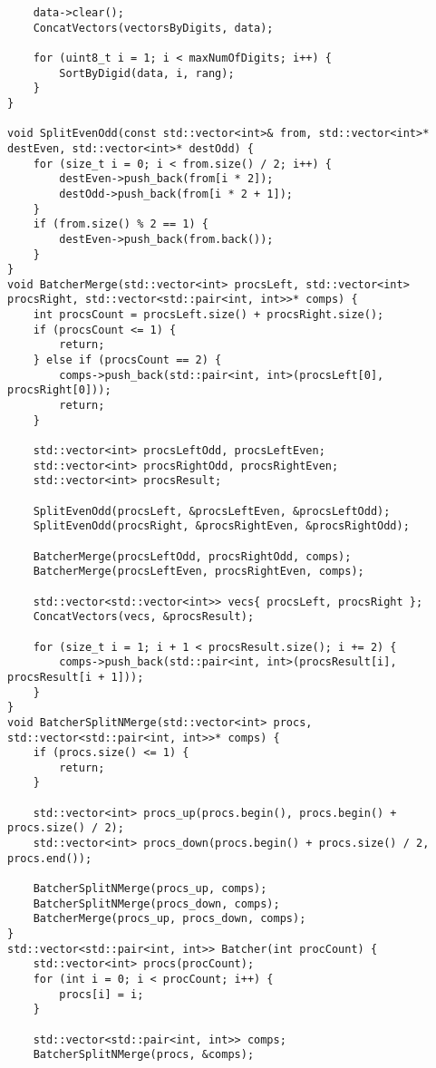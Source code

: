 \documentclass{report}
\begin{document}
\begin{lstlisting}
    data->clear();
    ConcatVectors(vectorsByDigits, data);

    for (uint8_t i = 1; i < maxNumOfDigits; i++) {
        SortByDigid(data, i, rang);
    }
}

void SplitEvenOdd(const std::vector<int>& from, std::vector<int>* destEven, std::vector<int>* destOdd) {
    for (size_t i = 0; i < from.size() / 2; i++) {
        destEven->push_back(from[i * 2]);
        destOdd->push_back(from[i * 2 + 1]);
    }
    if (from.size() % 2 == 1) {
        destEven->push_back(from.back());
    }
}
void BatcherMerge(std::vector<int> procsLeft, std::vector<int> procsRight, std::vector<std::pair<int, int>>* comps) {
    int procsCount = procsLeft.size() + procsRight.size();
    if (procsCount <= 1) {
        return;
    } else if (procsCount == 2) {
        comps->push_back(std::pair<int, int>(procsLeft[0], procsRight[0]));
        return;
    }

    std::vector<int> procsLeftOdd, procsLeftEven;
    std::vector<int> procsRightOdd, procsRightEven;
    std::vector<int> procsResult;

    SplitEvenOdd(procsLeft, &procsLeftEven, &procsLeftOdd);
    SplitEvenOdd(procsRight, &procsRightEven, &procsRightOdd);

    BatcherMerge(procsLeftOdd, procsRightOdd, comps);
    BatcherMerge(procsLeftEven, procsRightEven, comps);

    std::vector<std::vector<int>> vecs{ procsLeft, procsRight };
    ConcatVectors(vecs, &procsResult);

    for (size_t i = 1; i + 1 < procsResult.size(); i += 2) {
        comps->push_back(std::pair<int, int>(procsResult[i], procsResult[i + 1]));
    }
}
void BatcherSplitNMerge(std::vector<int> procs, std::vector<std::pair<int, int>>* comps) {
    if (procs.size() <= 1) {
        return;
    }

    std::vector<int> procs_up(procs.begin(), procs.begin() + procs.size() / 2);
    std::vector<int> procs_down(procs.begin() + procs.size() / 2, procs.end());

    BatcherSplitNMerge(procs_up, comps);
    BatcherSplitNMerge(procs_down, comps);
    BatcherMerge(procs_up, procs_down, comps);
}
std::vector<std::pair<int, int>> Batcher(int procCount) {
    std::vector<int> procs(procCount);
    for (int i = 0; i < procCount; i++) {
        procs[i] = i;
    }

    std::vector<std::pair<int, int>> comps;
    BatcherSplitNMerge(procs, &comps);


\end{lstlisting}
\end{document}
